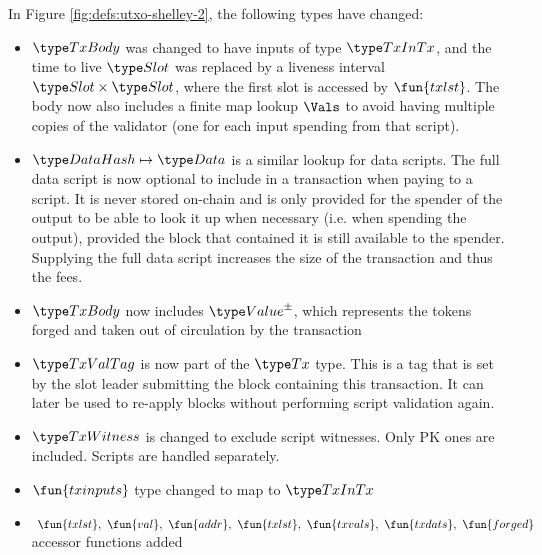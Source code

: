 In Figure \ref{fig:defs:utxo-shelley-2}, the following types have changed:

\begin{itemize}
  \item $\TxBody$ was changed to have inputs of type $\TxInTx$, and the
  time to live $\Slot$ was replaced by a liveness interval $\Slot \times \Slot$,
  where the first slot is accessed by $\fun{txlst}$. The body now also includes
  a finite map lookup $\Vals$ to avoid having multiple
  copies of the validator (one for each input spending from that script).
  \item $\HashDat \mapsto \Data$ is a similar lookup for data scripts.
  The full data script is now optional to include in a transaction when
  paying to a script. It is never
  stored on-chain and is only provided for the spender of the output
  to be able to look it up when necessary (i.e. when spending the output),
  provided the block that contained it is still available to the spender.
  Supplying the full data script increases the size of the transaction and
  thus the fees.
  \item $\TxBody$ now includes $\ValuePM$, which represents
  the tokens forged and taken out of circulation by the transaction
  \item $\TxValTag$ is now part of the $\Tx$ type. This is a tag that is
  set by the slot leader submitting the block containing this transaction.
  It can later be used to re-apply blocks without performing script validation
  again.
  \item $\TxWitness$ is changed to exclude script witnesses. Only PK ones
  are included. Scripts are handled separately.
  \item $\fun{txinputs}$ type changed to map to $\TxInTx$
  \item $~\fun{txlst},~\fun{val},~\fun{addr},~\fun{txlst},~\fun{txvals},~\fun{txdats},
  ~\fun{forged}$
  accessor functions added
\end{itemize}



